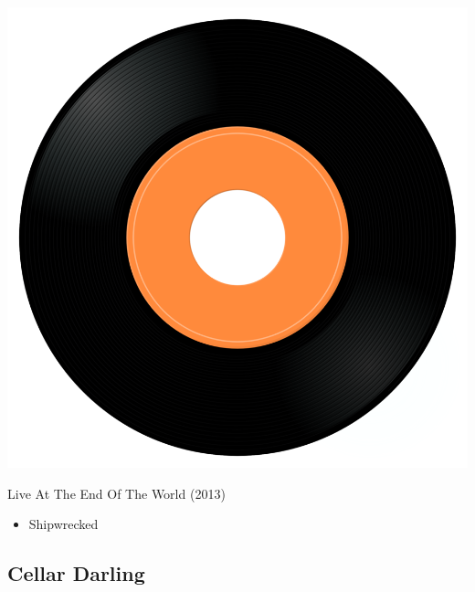 \begin{minipage}[t]{0.25\textwidth}
\captionsetup{type=figure}
\includegraphics[width=\textwidth]{Images/cover.png}
\caption*{Live At The End Of The World (2013)}
\end{minipage}
\begin{minipage}[t]{0.25\textwidth}\vspace{0pt}
\begin{itemize}[nosep,leftmargin=1em,labelwidth=*,align=left]
	\setlength{\itemsep}{0pt}
	\item Shipwrecked
\end{itemize}
\end{minipage}

\subsection{Cellar Darling}

